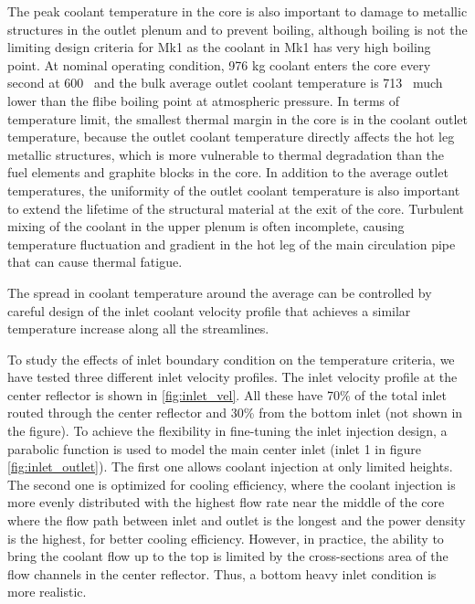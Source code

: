 \documentclass{elsarticle}
\begin{document}
The peak coolant temperature in the core is also important to damage to metallic structures in the outlet plenum and to prevent boiling, although boiling is not the limiting design criteria for Mk1 as the coolant in Mk1 has very high boiling point. At nominal operating condition, 976 kg coolant enters the core every second at 600 \degc\ and the bulk average outlet coolant temperature is 713 \degc\, much lower than the flibe boiling point at atmospheric pressure.
In terms of temperature limit, the smallest thermal margin in the core is in the coolant outlet temperature, because the outlet coolant temperature directly affects the hot leg metallic structures, which is more vulnerable to thermal degradation than the fuel elements and graphite blocks in the core. 
In addition to the average outlet temperatures, the uniformity of the  outlet coolant temperature is also important to extend the lifetime of the structural material at the exit of the core. Turbulent mixing of the coolant in the upper plenum is often incomplete, causing temperature fluctuation and gradient in the hot leg of the main circulation pipe that can cause thermal fatigue. 

 The spread in coolant temperature around the average can be controlled by careful design of the inlet coolant velocity profile that achieves a similar temperature increase along all the streamlines.

To study the effects of inlet boundary condition on the temperature criteria, we have tested three different inlet velocity profiles. The inlet velocity profile at the center reflector is shown in \ref{fig:inlet_vel}. All these have 70\% of the total inlet routed through the center reflector and 30\% from the bottom inlet (not shown in the figure). 
To achieve the flexibility in fine-tuning the inlet injection design, a parabolic function is used to model the main center inlet (inlet 1 in figure \ref{fig:inlet_outlet}). The first one allows coolant injection at only limited heights.
The second one is optimized for cooling efficiency, where the coolant injection is more evenly distributed with the highest flow rate near the middle of the core where the flow path between inlet and outlet is the longest and the power density is the highest, for better cooling efficiency.
However, in practice, the ability to bring the coolant flow up to the top is limited by the cross-sections area of the flow channels in the center reflector. Thus, a bottom heavy inlet condition is more realistic. 
\end{document}
